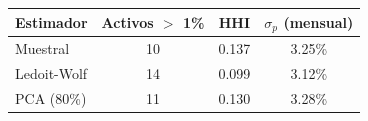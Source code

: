 \begin{tabular}{lccc}
\toprule
Estimador & Activos $>$ 1\% & HHI & $\sigma_p$ (mensual) \\
\midrule
Muestral & 10 & 0.137 & 3.25\% \\
Ledoit-Wolf & 14 & 0.099 & 3.12\% \\
PCA (80\%) & 11 & 0.130 & 3.28\% \\
\bottomrule
\end{tabular}
